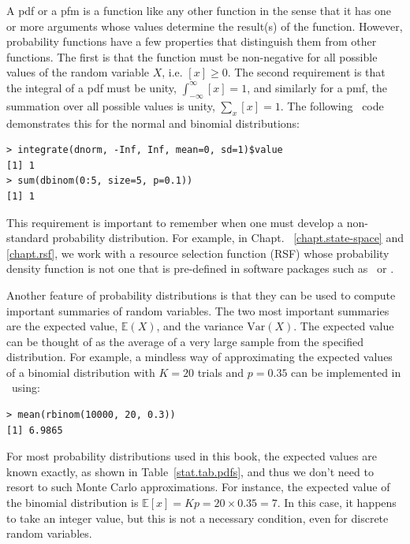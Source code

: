 A pdf or a pfm is a function like any other function
in the sense that it has one or more arguments whose values determine
the result(s) of the function. However, probability functions have a few
properties that distinguish them from other functions.
The first is that the function
must be non-negative for all possible values of the random variable
$X$, i.e. $[x] \geq 0$. The second requirement is that the integral of
a pdf must be unity, $\int_{-\infty}^{\infty} [x] = 1$, and similarly
for a pmf, the summation over all possible values is unity, $\sum_x [x]
= 1$. The following \R~code demonstrates
this for the normal and binomial distributions:
\begin{verbatim}
> integrate(dnorm, -Inf, Inf, mean=0, sd=1)$value
[1] 1
> sum(dbinom(0:5, size=5, p=0.1))
[1] 1
\end{verbatim}
This requirement is important to remember when one must develop a
non-standard probability distribution. For example, in Chapt.
~\ref{chapt.state-space} and \ref{chapt.rsf},
we work with a resource selection function (RSF) whose probability
density function is not one that is pre-defined in software packages
such as \R~or \bugs.

Another feature of probability distributions is that they can be used
to compute important summaries of random variables. The two most
important summaries are the expected value, $\mathbb{E}(X)$,
and the variance $\text{Var}(X)$. The expected value
can be thought of as the average
of a very large sample from the specified distribution. For
example, a mindless way of approximating the expected values of a binomial
distribution with $K=20$ trials and $p=0.35$ can be implemented in \R~using:
\begin{verbatim}
> mean(rbinom(10000, 20, 0.3))
[1] 6.9865
\end{verbatim}
For most probability distributions used in this book, the expected
values are known exactly, as shown in Table~\ref{stat.tab.pdfs}, and
thus we don't need to resort to such Monte Carlo approximations. For instance, the
expected value of the binomial distribution is $\mathbb{E}[x] = Kp =
20 \times 0.35 = 7$. In this case, it happens to take an integer
value, but this is not a necessary condition, even for discrete random
variables.


